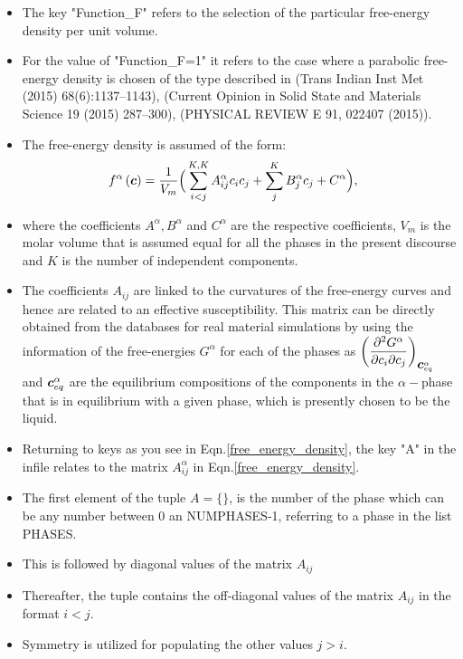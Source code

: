 \documentclass[a4paper,10pt]{article}
\newcommand{\vc}{\mbox{\boldmath{$c$}}}
\begin{document}
\begin{itemize}
 \item The key "Function\_F" refers to the selection of the particular free-energy density per unit volume.
 \item For the value of "Function\_F=1" it refers to the case where a parabolic free-energy density is chosen 
 of the type described in (Trans Indian Inst Met (2015) 68(6):1137–1143), (Current Opinion in Solid State and Materials Science 19 (2015) 287–300), 
 (PHYSICAL REVIEW E 91, 022407 (2015)).
 \item The free-energy density is assumed of the form:
 \begin{align}
  f^{\alpha}\left(\vc\right) &= \dfrac{1}{V_m}\Big(\sum_{i<j}^{K,K}A_{ij}^{\alpha}c_ic_j + \sum_j^{K} B_j^{\alpha} c_j + C^{\alpha}\Big),
  \label{free_energy_density}
 \end{align}
 \item where the coefficients $A^{\alpha}, B^{\alpha}$ and $C^{\alpha}$ are the respective coefficients,
$V_m$ is the molar volume that is assumed equal for all the phases in the present discourse and 
$K$ is the number of independent components.
\item The coefficients $A_{ij}$ are linked to the curvatures of the free-energy curves and hence are 
related to an effective susceptibility. This matrix can be directly
obtained from the databases for real material simulations 
by using the information of the free-energies $G^{\alpha}$ for each of the phases as 
$\left(\dfrac{\partial^2 G^{\alpha}}{\partial c_i\partial c_j}\right)_{\vc^{\alpha}_{eq}}$ 
and $\vc^{\alpha}_{eq}$ are the equilibrium compositions of the components in the 
$\alpha-$phase that is in equilibrium with a given 
phase, which is presently chosen to be the liquid. 

\item Returning to keys as you see in Eqn.\ref{free_energy_density}, the key "A" in the infile 
relates to the matrix $A_{ij}^{\alpha}$ in Eqn.\ref{free_energy_density}. 
\item The first element of the tuple $A=\{\}$, is the number of the phase which can be any number between 0 an NUMPHASES-1, referring to a phase in the list PHASES.
\item This is followed by diagonal values of the matrix $A_{ij}$
\item Thereafter, the tuple contains the off-diagonal values of the matrix $A_{ij}$ in the format $i<j$.
\item Symmetry is utilized for populating the other values $j>i$.


\end{itemize}
\end{document}
